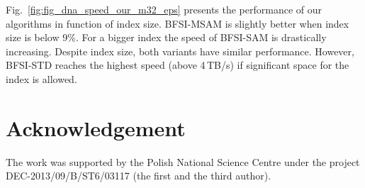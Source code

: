 \documentclass{llncs}
\begin{document}
Fig.~\ref{fig:fig_dna_speed_our_m32_eps} presents the performance of our algorithms in function of index size.
BFSI-MSAM is slightly better when index size is below 9\%. 
For a bigger index the speed of BFSI-SAM is drastically increasing. 
Despite index size, both variants have similar performance. 
However, BFSI-STD reaches the highest speed 
(above 4\,TB/s) 
if significant space for the index is allowed.





\section*{Acknowledgement}
The work was supported by the Polish National Science Centre under the project DEC-2013/09/B/ST6/03117 (the first and the third author).



\end{document}
